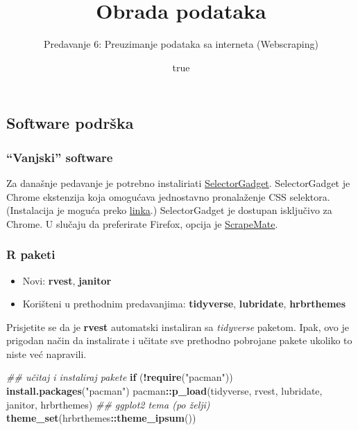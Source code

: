\documentclass[
]{article}
\title{Obrada podataka}
\subtitle{Predavanje 6: Preuzimanje podataka sa interneta (Webscraping)}
\author{true}
\date{}
\newenvironment{Shaded}{\begin{snugshade}}{\end{snugshade}}
\newcommand{\CommentTok}[1]{\textcolor[rgb]{0.56,0.35,0.01}{\textit{#1}}}
\newcommand{\ControlFlowTok}[1]{\textcolor[rgb]{0.13,0.29,0.53}{\textbf{#1}}}
\newcommand{\KeywordTok}[1]{\textcolor[rgb]{0.13,0.29,0.53}{\textbf{#1}}}
\newcommand{\NormalTok}[1]{#1}
\newcommand{\OperatorTok}[1]{\textcolor[rgb]{0.81,0.36,0.00}{\textbf{#1}}}
\newcommand{\StringTok}[1]{\textcolor[rgb]{0.31,0.60,0.02}{#1}}
\providecommand{\tightlist}{%
  \setlength{\itemsep}{0pt}\setlength{\parskip}{0pt}}
\begin{document}
\maketitle

{
\setcounter{tocdepth}{4}
\tableofcontents
}
\hypertarget{software-podrux161ka}{%
\subsection{Software podrška}\label{software-podrux161ka}}

\hypertarget{vanjski-software}{%
\subsubsection{``Vanjski'' software}\label{vanjski-software}}

Za današnje pedavanje je potrebno instaliriati
\href{https://selectorgadget.com/}{SelectorGadget}. SelectorGadget je
Chrome ekstenzija koja omogućava jednostavno pronalaženje CSS
selektora.(Instalacija je moguća preko
\href{https://chrome.google.com/webstore/detail/selectorgadget/mhjhnkcfbdhnjickkkdbjoemdmbfginb}{linka}.)
SelectorGadget je dostupan isključivo za Chrome. U slučaju da
preferirate Firefox, opcija je
\href{https://addons.mozilla.org/en-US/firefox/addon/scrapemate/}{ScrapeMate}.

\hypertarget{r-paketi}{%
\subsubsection{R paketi}\label{r-paketi}}

\begin{itemize}
\tightlist
\item
  Novi: \textbf{rvest}, \textbf{janitor}
\item
  Korišteni u prethodnim predavanjima: \textbf{tidyverse},
  \textbf{lubridate}, \textbf{hrbrthemes}
\end{itemize}

Prisjetite se da je \textbf{rvest} automatski instaliran sa
\emph{tidyverse} paketom. Ipak, ovo je prigodan način da instalirate i
učitate sve prethodno pobrojane pakete ukoliko to niste već napravili.

\begin{Shaded}
\begin{Highlighting}[]
\CommentTok{## učitaj i instaliraj pakete}
\ControlFlowTok{if}\NormalTok{ (}\OperatorTok{!}\KeywordTok{require}\NormalTok{(}\StringTok{"pacman"}\NormalTok{)) }\KeywordTok{install.packages}\NormalTok{(}\StringTok{"pacman"}\NormalTok{)}
\NormalTok{pacman}\OperatorTok{::}\KeywordTok{p_load}\NormalTok{(tidyverse, rvest, lubridate, janitor, hrbrthemes)}
\CommentTok{## ggplot2 tema (po želji)}
\KeywordTok{theme_set}\NormalTok{(hrbrthemes}\OperatorTok{::}\KeywordTok{theme_ipsum}\NormalTok{())}
\end{Highlighting}
\end{Shaded}
\end{document}
